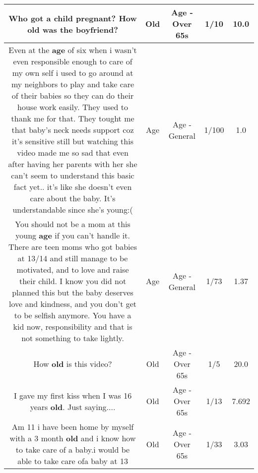 \documentclass[11pt]{article}
\newlength\mylength
\begin{document}
\begin{center}
\begin{longtable}{|C{.65\mylength}|C{.30\mylength}|C{.12\mylength}|C{.12\mylength}|C{.12\mylength}|}
  \small Who got a child pregnant? How \textbf{old} was the boyfriend?\normalsize   & Old & Age - Over 65s & 1/10 & 10.0 \\  \hline
  \small Even at the \textbf{age} of six when i wasn't even responsible enough to care of my own self i used to go around at my neighbors to play and take care of their babies so they can do their house work easily. They used to thank me for that. They tought me that baby's neck needs support coz it's sensitive still but watching this video made me so sad that even after having her parents with her she can't seem to understand this basic fact yet.. it's like she doesn't even care about the baby. It's understandable since she's young:(\normalsize   & Age & Age - General & 1/100 & 1.0 \\  \hline
  \small You should not be a mom at this young \textbf{age} if you can't handle it. There are teen moms who got babies at 13/14 and still manage to be motivated, and to love and raise their child. I know you did not planned this but the baby deserves love and kindness, and you don't get to be selfish anymore. You have a kid now, responsibility and that is not something to take lightly.\normalsize   & Age & Age - General & 1/73 & 1.37 \\  \hline
  \small How \textbf{old} is this video?\normalsize   & Old & Age - Over 65s & 1/5 & 20.0 \\  \hline
  \small I gave my first kiss when I was 16 years \textbf{old}. Just saying....\normalsize   & Old & Age - Over 65s & 1/13 & 7.692 \\  \hline
  \small Am 11 i have been home by myself with a 3 month \textbf{old} and i know how to take care of a baby.i would be able to take care ofa baby at 13\normalsize   & Old & Age - Over 65s & 1/33 & 3.03 \\  \hline

\end{longtable}
\end{center}
\end{document}
